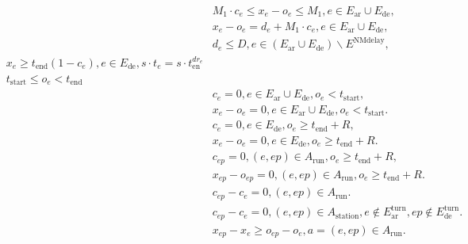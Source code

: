 \begin{align}
  &  & M_{1} \cdot c_{e} \leq x_{e} - o_{e} \leq M_{1} , e \in E_{\text{ar}} \cup E_{\text{de}} ,  \tag{eq\_0001} \\
  &  & x_{e} - o_{e} = d_{e} + M_{1} \cdot c_{e} , e \in E_{\text{ar}} \cup E_{\text{de}} ,  \tag{eq\_0002} \\
  &  & d_{e} \leq D , e \in \left(E_{\text{ar}} \cup E_{\text{de}}\right) \backslash E^{\text{NMdelay}} ,  \tag{eq\_0004} \\
  & x_{e} \geq t_{\text{end}} \left(1 - c_{e}\right) , e \in E_{\text{de}} , s \cdot t_{e} = s \cdot t_{\text{en}}^{d r_{e}} \tag{eq\_0005\_a} \\
  & t_{\text{start}} \leq o_{e} < t_{\text{end}} \tag{eq\_0005\_b} \\
  &  & c_{e} = 0 , e \in E_{\text{ar}} \cup E_{\text{de}} , o_{e} < t_{\text{start}} ,  \tag{eq\_0006} \\
  &  & x_{e} - o_{e} = 0 , e \in E_{\text{ar}} \cup E_{\text{de}} , o_{e} < t_{\text{start}} .  \tag{eq\_0007} \\
  &  & c_{e} = 0 , e \in E_{\text{de}} , o_{e} \geq t_{\text{end}} + R ,  \tag{eq\_0008} \\
  &  & x_{e} - o_{e} = 0 , e \in E_{\text{de}} , o_{e} \geq t_{\text{end}} + R .  \tag{eq\_0009} \\
  &  & c_{ep} = 0 , \left(e , ep\right) \in A_{\text{run}} , o_{e} \geq t_{\text{end}} + R ,  \tag{eq\_0010} \\
  &  & x_{ep} - o_{ep} = 0 , \left(e , ep\right) \in A_{\text{run}} , o_{e} \geq t_{\text{end}} + R .  \tag{eq\_0011} \\
  &  & c_{ep} - c_{e} = 0 , \left(e , ep\right) \in A_{\text{run}} .  \tag{eq\_0012} \\
  &  & c_{ep} - c_{e} = 0 , \left(e , ep\right) \in A_{\text{station}} , e \notin E_{\text{ar}}^{\text{turn}} , ep \notin E_{\text{de}}^{\text{turn}} .  \tag{eq\_0013} \\
  &  & x_{ep} - x_{e} \geq o_{ep} - o_{e} , a = \left(e , ep\right) \in A_{\text{run}} .  \tag{eq\_0014} \\

\end{align}

